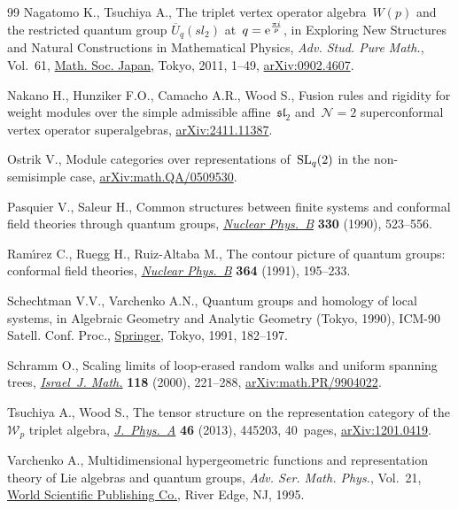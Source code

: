 \documentclass[10pt,a4paper]{amsart}
\numberwithin{equation}{section}
\begin{document}
\begin{thebibliography}{99}
Nagatomo K., Tsuchiya A., The triplet vertex operator algebra~{$W(p)$} and the
 restricted quantum group {$\overline U_q(sl_2)$} at~{$q={\rm e}^{\frac{\pi
 i}{p}}$}, in Exploring {N}ew {S}tructures and {N}atural {C}onstructions in
 {M}athematical {P}hysics, \textit{Adv. Stud. Pure Math.}, Vol.~61,
 \href{https://doi.org/10.2969/aspm/06110001}{Math. Soc. Japan}, Tokyo, 2011,
 1--49, \href{http://arxiv.org/abs/0902.4607}{arXiv:0902.4607}.

Nakano H., Hunziker F.O., Camacho A.R., Wood S., Fusion rules and rigidity for
 weight modules over the simple admissible affine~$\mathfrak{sl}_{2}$
 and~${\mathcal{N}=2}$ superconformal vertex operator superalgebras,
 \href{http://arxiv.org/abs/2411.11387}{arXiv:2411.11387}.

Ostrik V., Module categories over representations of~${{\rm SL}_q (2)}$ in the
 non-semisimple case,
 \href{http://arxiv.org/abs/math.QA/0509530}{arXiv:math.QA/0509530}.

Pasquier V., Saleur H., Common structures between finite systems and conformal
 field theories through quantum groups,
 \href{https://doi.org/10.1016/0550-3213(90)90122-T}{\textit{Nuclear Phys.~B}}
 \textbf{330} (1990), 523--556.

Ram\'{\i}rez C., Ruegg H., Ruiz-Altaba M., The contour picture of quantum
 groups: conformal field theories,
 \href{https://doi.org/10.1016/0550-3213(91)90583-J}{\textit{Nuclear Phys.~B}}
 \textbf{364} (1991), 195--233.

Schechtman V.V., Varchenko A.N., Quantum groups and homology of local systems,
 in Algebraic {G}eometry and {A}nalytic {G}eometry ({T}okyo, 1990), ICM-90
 Satell. Conf. Proc.,
 \href{https://doi.org/10.1007/978-4-431-68172-4_10}{Springer}, Tokyo, 1991,
 182--197.

Schramm O., Scaling limits of loop-erased random walks and uniform spanning
 trees, \href{https://doi.org/10.1007/BF02803524}{\textit{Israel~J. Math.}}
 \textbf{118} (2000), 221--288,
 \href{http://arxiv.org/abs/math.PR/9904022}{arXiv:math.PR/9904022}.

Tsuchiya A., Wood S., The tensor structure on the representation category of
 the {$\mathcal{W}_p$} triplet algebra,
 \href{https://doi.org/10.1088/1751-8113/46/44/445203}{\textit{J.~Phys.~A}}
 \textbf{46} (2013), 445203, 40~pages,
 \href{http://arxiv.org/abs/1201.0419}{arXiv:1201.0419}.

Varchenko A., Multidimensional hypergeometric functions and representation
 theory of {L}ie algebras and quantum groups, \textit{Adv. Ser. Math. Phys.},
 Vol.~21, \href{https://doi.org/10.1142/2467}{World Scientific Publishing Co.},
 River Edge, NJ, 1995.

\end{thebibliography}
\end{document}
